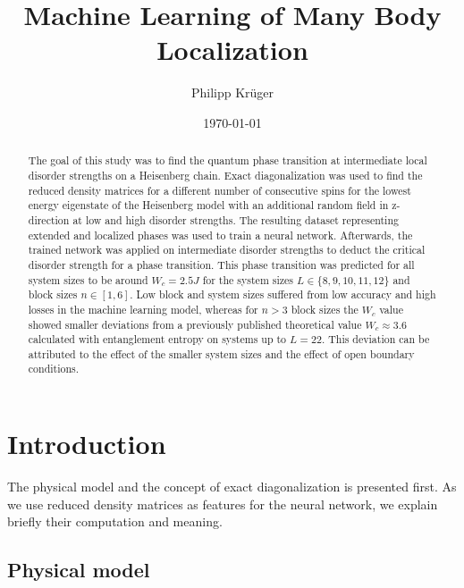 \documentclass[reprint,amsmath,amssymb,aps,prb]{revtex4-2}
\begin{document}
%

\title{Machine Learning of Many Body Localization}

\author{Philipp Krüger}

\date{\today}%

\begin{abstract}
The goal of this study was to find the quantum phase transition at intermediate local disorder strengths on a Heisenberg chain. Exact diagonalization was used to find the reduced density matrices for a different number of consecutive spins for the lowest energy eigenstate of the Heisenberg model with an additional random field in z-direction at low and high disorder strengths. The resulting dataset representing extended and localized phases was used to train a neural network. Afterwards, the trained network was applied on intermediate disorder strengths to deduct the critical disorder strength for a phase transition. This phase transition was predicted for all system sizes to be around $W_c = 2.5 J$ for the system sizes $L\in\{8, 9, 10, 11, 12\}$ and block sizes $n\in\left[1,6\right]$. Low block and system sizes suffered from low accuracy and high losses in the machine learning model, whereas for $n>3$ block sizes the $W_c$ value showed smaller deviations from a previously published theoretical value $W_c\approx3.6$ calculated with entanglement entropy on systems up to $L=22$. This deviation can be attributed to the effect of the smaller system sizes and the effect of open boundary conditions.
\end{abstract}

\maketitle

\section{Introduction}

The physical model and the concept of exact diagonalization is presented first. As we use reduced density matrices as features for the neural network, we explain briefly their computation and meaning.
\subsection{Physical model}
\end{document}
